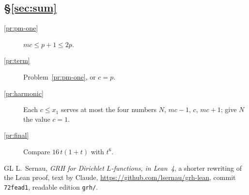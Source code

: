 \documentclass[reqno]{amsart}
\theoremstyle{definition}
\theoremstyle{plain}
\theoremstyle{definition}
\theoremstyle{remark}
\begin{document}
\subsection*{\S\ref{sec:sum}}
\begin{description}
\item[\ref{pr:pm-one}] \(mc \le p + 1 \le 2p\).
\item[\ref{pr:term}] Problem~\ref{pr:pm-one}, or \(c = p\).
\item[\ref{pr:harmonic}] Each \(c \le x_1\) serves at most the four numbers \(N\), \(mc - 1\), \(c\), \(mc + 1\); give \(N\) the value \(c = 1\).
\item[\ref{pr:final}] Compare \(16\,t(1 + t)\) with \(t^6\).
\end{description}

\begin{thebibliography}{GL}
 L.~Sernau, \emph{GRH for Dirichlet \(L\)-functions, in Lean~4}, a shorter rewriting of the Lean proof, text by Claude, \url{https://github.com/lsernau/grh-lean}, commit \texttt{72fead1}, readable edition \texttt{grh/}.
\end{thebibliography}
\end{document}
